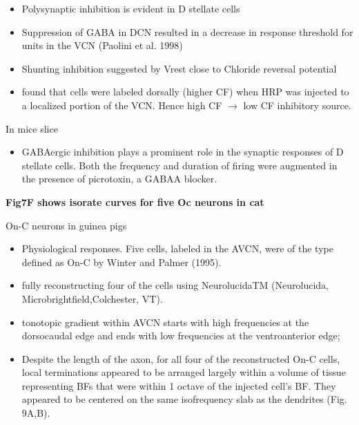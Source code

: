 \documentclass[10pt,a4paper]{article}
\begin{document}
\begin{itemize}
\item Polysynaptic inhibition is evident in D stellate cells
  \citep{FerragamoGoldingEtAl:1998a,PaoliniClark:1999, PaoliniClark:1998}
\item Suppression of GABA in DCN resulted in a decrease in response threshold
  for units in the VCN (Paolini et al. 1998)
\item Shunting inhibition suggested by \citep{SmithRhode:1989} Vrest close to
  Chloride reversal potential
\item \citep{WickesbergOertel:1988} found that cells were labeled dorsally
  (higher CF) when HRP was injected to a localized portion of the VCN. Hence
  high CF \ensuremath{\rightarrow} low CF inhibitory source.
\end{itemize}
In mice slice \citep{FerragamoGoldingEtAl:1998a}


\begin{itemize}
\item GABAergic inhibition plays a prominent role in the synaptic responses of D
  stellate cells. Both the frequency and duration of firing were augmented in
  the presence of picrotoxin, a GABAA blocker.
\end{itemize}
\citep{RhodeSmith:1986}

{\bfseries Fig7F \citep{RhodeSmith:1986} shows isorate curves for five Oc
  neurons in cat}

On-C neurons \citep{ArnottWallaceEtAl:2004} in guinea pigs


\begin{itemize}
\item Physiological responses. Five cells, labeled in the AVCN, were of the type
  defined as On-C by Winter and Palmer (1995).
\item fully reconstructing four of the cells using NeurolucidaTM (Neurolucida,
  Microbrightfield,Colchester, VT).
\item tonotopic gradient within AVCN starts with high frequencies at the
  dorsocaudal edge and ends with low frequencies at the ventroanterior edge;
\item Despite the length of the axon, for all four of the reconstructed On-C
  cells, local terminations appeared to be arranged largely within a volume of
  tissue representing BFs that were within 1 octave of the injected
  cell{\textquoteright}s BF. They appeared to be centered on the same
  isofrequency slab as the dendrites (Fig. 9A,B).
\end{itemize}
\end{document}
